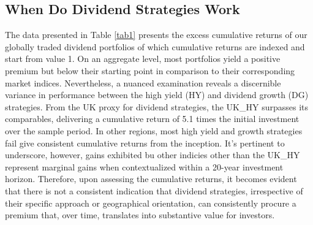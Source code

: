 \documentclass[12pt,preprint, authoryear]{elsarticle}
\numberwithin{equation}{section}
\numberwithin{figure}{section}
\numberwithin{table}{section}
\begin{document}
\hypertarget{when-do-dividend-strategies-work}{%
\subsection{When Do Dividend Strategies
Work}\label{when-do-dividend-strategies-work}}

The data presented in Table \ref{tab1} presents the excess cumulative
returns of our globally traded dividend portfolios of which cumulative
returns are indexed and start from value 1. On an aggregate level, most
portfolios yield a positive premium but below their starting point in
comparison to their corresponding market indices. Nevertheless, a
nuanced examination reveals a discernible variance in performance
between the high yield (HY) and dividend growth (DG) strategies. From
the UK proxy for dividend strategies, the UK\_HY surpasses its
comparables, delivering a cumulative return of 5.1 times the initial
investment over the sample period. In other regions, most high yield and
growth strategies fail give consistent cumulative returns from the
inception. It's pertinent to underscore, however, gains exhibited bu
other indicies other than the UK\_HY represent marginal gains when
contextualized within a 20-year investment horizon. Therefore, upon
assessing the cumulative returns, it becomes evident that there is not a
consistent indication that dividend strategies, irrespective of their
specific approach or geographical orientation, can consistently procure
a premium that, over time, translates into substantive value for
investors.
\end{document}
